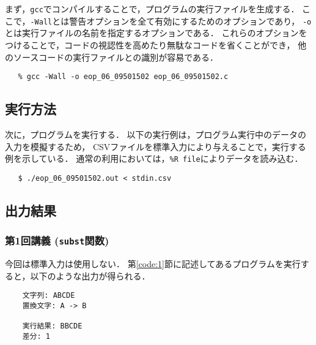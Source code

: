 \documentclass[autodetect-engine,dvi=dvipdfmx,ja=standard,
               a4j,11pt]{bxjsarticle}
\begin{document}
まず，\verb|gcc|でコンパイルすることで，プログラムの実行ファイルを生成する．
ここで，\verb|-Wall|とは警告オプションを全て有効にするためのオプションであり，
\verb|-o|とは実行ファイルの名前を指定するオプションである．
これらのオプションをつけることで，コードの視認性を高めたり無駄なコードを省くことができ，
他のソースコードの実行ファイルとの識別が容易である．

{\fontsize{10pt}{11pt} \selectfont
 \begin{verbatim}
   % gcc -Wall -o eop_06_09501502 eop_06_09501502.c
 \end{verbatim}
}

\subsection{実行方法}

次に，プログラムを実行する．
以下の実行例は，プログラム実行中のデータの入力を模擬するため，
CSVファイルを標準入力により与えることで，実行する例を示している．
通常の利用においては，\verb|%R file|によりデータを読み込む．

{\fontsize{10pt}{11pt} \selectfont
 \begin{verbatim}
   $ ./eop_06_09501502.out < stdin.csv
 \end{verbatim}
}

\subsection{出力結果}

\subsubsection{第1回講義 (\texttt{subst}関数)}

今回は標準入力は使用しない．
第\ref{code:1}節に記述してあるプログラムを実行すると，以下のような出力が得られる．

{\fontsize{10pt}{11pt} \selectfont
 \begin{verbatim}
    文字列: ABCDE
    置換文字: A -> B

    実行結果: BBCDE
    差分: 1
 \end{verbatim}
}
\end{document}
